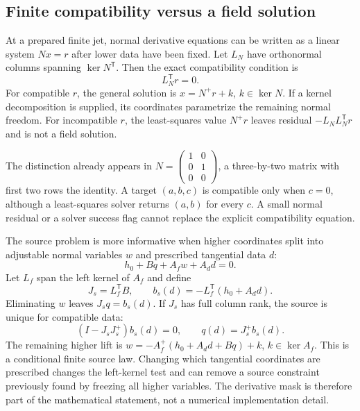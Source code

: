 \subsection{Finite compatibility versus a field solution}
At a prepared finite jet, normal derivative equations can be written
as a linear system $Nx=r$ after lower data have been fixed. Let
$L_N$ have orthonormal columns spanning $\ker N^{\mathsf T}$.
Then the exact compatibility condition is
\begin{equation}
 L_N^{\mathsf T}r=0.
\end{equation}
For compatible $r$, the general solution is
$x=N^+r+k$, $k\in\ker N$. If a kernel decomposition is supplied,
its coordinates parametrize the remaining normal freedom. For
incompatible $r$, the least-squares value $N^+r$ leaves residual
$-L_NL_N^{\mathsf T}r$ and is not a field solution.

The distinction already appears in
$N=\begin{pmatrix}1&0\\0&1\\0&0\end{pmatrix}$, a three-by-two
matrix with first two rows the identity. A target $(a,b,c)$ is
compatible only when $c=0$, although a least-squares solver returns
$(a,b)$ for every $c$. A small normal residual or a solver success
flag cannot replace the explicit compatibility equation.

The source problem is more informative when higher coordinates split
into adjustable normal variables $w$ and prescribed tangential data $d$:
\begin{equation}
 h_0+Bq+A_fw+A_dd=0.
\end{equation}
Let $L_f$ span the left kernel of $A_f$ and define
\begin{equation}
 J_s=L_f^{\mathsf T}B,\qquad
 b_s(d)=-L_f^{\mathsf T}(h_0+A_dd).
\end{equation}
Eliminating $w$ leaves $J_sq=b_s(d)$. If $J_s$ has full column
rank, the source is unique for compatible data:
\begin{equation}
 (I-J_sJ_s^+)b_s(d)=0,\qquad q(d)=J_s^+b_s(d).
\end{equation}
The remaining higher lift is
$w=-A_f^+(h_0+A_dd+Bq)+k$, $k\in\ker A_f$.
This is a conditional finite source law. Changing which tangential
coordinates are prescribed changes the left-kernel test and can
remove a source constraint previously found by freezing all higher
variables. The derivative mask is therefore part of the mathematical
statement, not a numerical implementation detail.

